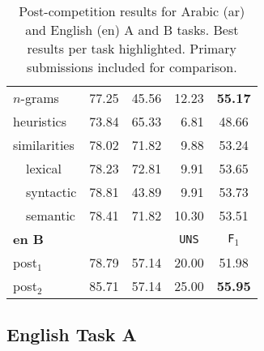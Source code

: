 \begin{table}[t]
\begin{tabular}{|l|cccc|}
 $n$-grams		& 77.25	& 45.56	& 12.23		& \bf 55.17\\
 heuristics		& 73.84	& 65.33	& \,\,\,6.81	& 48.66\\
 similarities		& 78.02	& 71.82	& \,\,\,9.88	& 53.24	\\
 \,\,\,\, lexical	& 78.23	& 72.81	& \,\,\,9.91	& 53.65	\\
 \,\,\,\, syntactic	& 78.81	& 43.89	& \,\,\,9.91	& 53.73	 \\
 \,\,\,\, semantic	& 78.41	& 71.82	& 10.30		& 53.51	 \\   
  \hline
  \hline
  \bf en B	& \yes & \no	& \texttt{UNS} & \texttt{F$_1$}	\\ \hline
 post$_1$	& 78.79	& 57.14	& 20.00		& 51.98 \\
 post$_2$	& 85.71	& 57.14	& 25.00 	& \bf 55.95 \\
 \hline
 \end{tabular}
 \caption{Post-competition results for Arabic (ar) and English (en) A and B 
tasks. Best results per task highlighted. Primary submissions included for 
comparison.
\label{tab:aftertask}}
\end{table}








\subsection{English Task A} \label{sec:discussiona}

